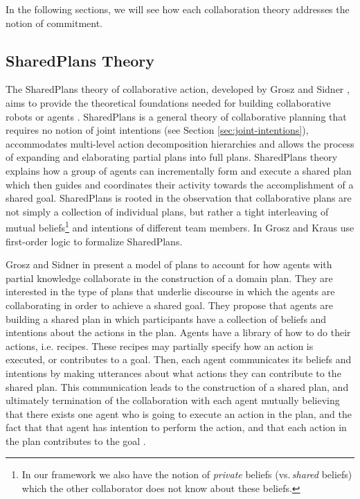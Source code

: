 \documentclass[12pt]{report}
\begin{document}
In the following sections, we will see how each collaboration theory addresses
the notion of commitment.

\subsection{SharedPlans Theory}
\label{sec:sharedplans}

The SharedPlans theory of collaborative action, developed by Grosz and Sidner
\cite{grosz:planning-acting, grosz:collaboration, grosz:plans-discourse}, aims
to provide the theoretical foundations needed for building collaborative
robots or agents \cite{grosz:collaborative-systems}. SharedPlans is a general
theory of collaborative planning that requires no notion of joint intentions
(see Section \ref{sec:joint-intentions}), accommodates multi-level action
decomposition hierarchies and allows the process of expanding and elaborating
partial plans into full plans. SharedPlans theory explains how a group of agents
can incrementally form and execute a shared plan which then guides and
coordinates their activity towards the accomplishment of a shared goal.
SharedPlans is rooted in the observation that collaborative plans are not simply
a collection of individual plans, but rather a tight interleaving of mutual
beliefs\footnote{\color{red}In our framework we also have the notion of
\textit{private} beliefs (vs.\,\textit{shared} beliefs) which the other
collaborator does not know about these beliefs.} and intentions of different
team members. In \cite{grosz:collaboration} Grosz and Kraus use first-order
logic to formalize SharedPlans.

Grosz and Sidner in \cite{grosz:plans-discourse} present a model of plans to
account for how agents with partial knowledge collaborate in the construction of
a domain plan. They are interested in the type of plans that underlie discourse
in which the agents are collaborating in order to achieve a shared goal. They
propose that agents are building a shared plan in which participants have a
collection of beliefs and intentions about the actions in the plan. Agents have
a library of how to do their actions, i.e. recipes. These recipes may partially
specify how an action is executed, or contributes to a goal. Then, each agent
communicates its beliefs and intentions by making utterances about what actions
they can contribute to the shared plan. This communication leads to the
construction of a shared plan, and ultimately termination of the collaboration
with each agent mutually believing that there exists one agent who is going to
execute an action in the plan, and the fact that that agent has intention to
perform the action, and that each action in the plan contributes to the goal
\cite{grosz:plans-discourse} \cite{lochbaum:plan-models}.
\end{document}
